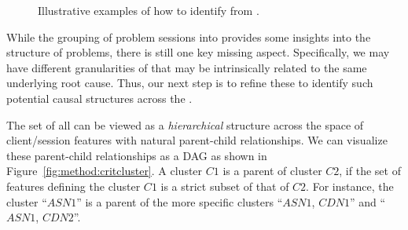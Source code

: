 \begin{figure}[t]
\centering
\captionsetup[subfigure]{justification=centering,farskip=-1pt,captionskip=5pt}
 \hspace{0.4cm}
\caption{Illustrative examples of how to identify \criticalclusters from \problemclusters.}
\label{fig:pattern:method}
\end{figure}

While the grouping of problem sessions into \problemclusters  
provides some insights into the structure of problems, 
there is still one key missing aspect. 
Specifically, we may have different granularities of \problemclusters
that may be intrinsically related to the same underlying root cause.
Thus, our next step is to refine these \problemclusters to identify such
potential causal structures across the \problemsessions. 

The set of all \clusters can be viewed as a \emph{hierarchical}
structure across the space of client/session features 
 with natural parent-child relationships. We can visualize
these parent-child relationships as a DAG as shown in 
Figure~\ref{fig:method:critcluster}.  
A cluster $\mathit{C1}$ is a parent of cluster $\mathit{C2}$, 
if the set of features defining the  cluster $\mathit{C1}$
is a strict subset of that of $\mathit{C2}$. 
For instance, the  cluster ``$\mathit{ASN1}$'' is a parent of
the more specific clusters ``$\mathit{ASN1}$, $\mathit{CDN1}$'' 
and   `` $\mathit{ASN1}$, $\mathit{CDN2}$''. 


